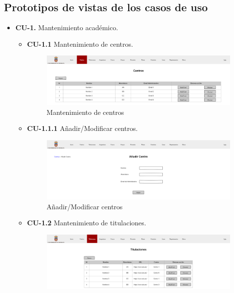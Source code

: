 \subsection{Prototipos de vistas de los casos de uso}
\begin{itemize}
	\item \textbf{CU-1.} Mantenimiento académico.
	\begin{itemize}
		\item \textbf{CU-1.1} Mantenimiento de centros.
		\begin{figure}[!h]
		\centering
		\includegraphics[width=\textwidth]{../img/Anexos/Vistas/centros.png}
		\caption{Mantenimiento de centros}
		\end{figure}
		\FloatBarrier
		\item \textbf{CU-1.1.1} Añadir/Modificar centros.
		\begin{figure}[!h]
		\centering
		\includegraphics[width=\textwidth]{../img/Anexos/Vistas/add_centro.png}
		\caption{Añadir/Modificar centros}
		\end{figure}
		\FloatBarrier
\newpage
		\item \textbf{CU-1.2} Mantenimiento de titulaciones.
		\begin{figure}[!h]
		\centering
		\includegraphics[width=\textwidth]{../img/Anexos/Vistas/titulaciones.png}

\end{figure}
\end{itemize}
\end{itemize}
